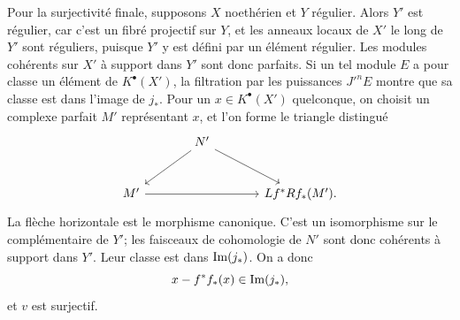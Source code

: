 \documentclass[11pt]{article}
\begin{document}
Pour la surjectivité finale, supposons \(X\) noethérien et \(Y\) régulier. Alors \(Y'\) est régulier, car c'est un fibré projectif sur \(Y\), et les anneaux locaux de \(X'\) le long de \(Y'\) sont réguliers, puisque \(Y'\) y est défini par un élément régulier. Les modules cohérents sur \(X'\) à support dans \(Y'\) sont donc parfaits. Si un tel module \(E\) a pour classe un élément de \(K^\bullet(X')\), la filtration par les puissances \(J'^nE\) montre que sa classe est dans l'image de \(j_*\). Pour un \(x\in K^\bullet(X')\) quelconque, on choisit un complexe parfait \(M'\) représentant \(x\), et l'on forme le triangle distingué
\[
\begin{tikzcd}[column sep=large,row sep=large]
& N' \arrow[dl] \arrow[dr] &\\
M' \arrow[rr] && Lf^*Rf_*(M').
\end{tikzcd}
\]
La flèche horizontale est le morphisme canonique. C'est un isomorphisme sur le complémentaire de \(Y'\); les faisceaux de cohomologie de \(N'\) sont donc cohérents à support dans \(Y'\). Leur classe est dans \(\operatorname{Im}(j_*)\). On a donc
\[
x-f^*f_*(x)\in\operatorname{Im}(j_*),
\]
et \(v\) est surjectif.
\end{document}

